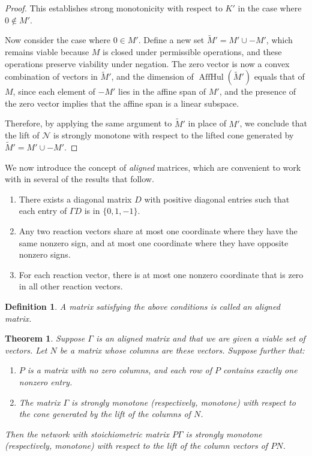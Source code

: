 \documentclass{article}
\newtheorem{thm}{Theorem}
\newtheorem{define}{Definition}
\begin{document}
\begin{proof}
This establishes strong monotonicity with respect to $K'$ in the case where $0 \notin M'$.

Now consider the case where $0 \in M'$. Define a new set $\widetilde{M}' = M' \cup -M'$, which remains viable because $M$ is closed under permissible operations, and these operations preserve viability under negation. The zero vector is now a convex combination of vectors in $\widetilde{M}'$, and the dimension of $\operatorname{AffHul}(\widetilde{M}')$ equals that of $M$, since each element of $-M'$ lies in the affine span of $M'$, and the presence of the zero vector implies that the affine span is a linear subspace.

Therefore, by applying the same argument to $\widetilde{M}'$ in place of $M'$, we conclude that the lift of $\mathcal{N}$ is strongly monotone with respect to the lifted cone generated by $\widetilde{M}' = M' \cup -M'$.
\end{proof}




We now introduce the concept of \textit{aligned} matrices, which are convenient to work with in several of the results that follow.

\begin{enumerate}
    \item There exists a diagonal matrix \( D \) with positive diagonal entries such that each entry of \( \Gamma D \) is in \( \{0, 1, -1\} \).
    
    \item Any two reaction vectors share at most one coordinate where they have the same nonzero sign, and at most one coordinate where they have opposite nonzero signs.
    
    \item For each reaction vector, there is at most one nonzero coordinate that is zero in all other reaction vectors.
\end{enumerate}

\begin{define}
A matrix satisfying the above conditions is called an \textit{aligned} matrix.
\end{define}


\begin{thm}
\label{thm:P*gamma network strongly monotone}
Suppose \( \Gamma \) is an aligned matrix and that we are given a viable set of vectors. Let \( N \) be a matrix whose columns are these vectors. Suppose further that:

\begin{enumerate}
    \item \( P \) is a matrix with no zero columns, and each row of \( P \) contains exactly one nonzero entry.
    \item The matrix \( \Gamma \) is strongly monotone (respectively, monotone) with respect to the cone generated by the lift of the columns of \( N \).
\end{enumerate}

Then the network with stoichiometric matrix \( P\Gamma \) is strongly monotone (respectively, monotone) with respect to the lift of the column vectors of \( PN \).
\end{thm}
\end{document}
